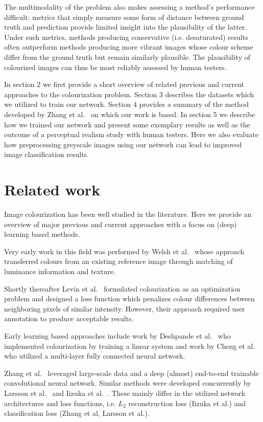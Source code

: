 \documentclass{article}
\begin{document}
The multimodality of the problem also makes assessing a method's performance
difficult: metrics that simply measure some form of distance between ground
truth and prediction provide limited insight into the plausibility of the
latter. Under such metrics, methods producing conservative (i.e. desaturated)
results often outperform methods producing more vibrant images whose colour
scheme differ from the ground truth but remain similarly plausible. The
plausibility of colourized images can thus be most reliably assessed by human
testers.

In section 2 we first provide a short overview of related previous and current
approaches to the colourization problem. Section 3 describes the datasets which
we utilized to train our network. Section 4 provides a summary of the
method developed by Zhang et al.~\cite{Zhang2016} on which our work is based.
In section 5 we describe how we trained our network and present some exemplary
results as well as the outcome of a perceptual realism study with human
testers. Here we also evaluate how preprocessing greyscale images using our
network can lead to improved image classification results.

\section{Related work}

Image colourization has been well studied in the literature. Here we provide an
overview of major previous and current approaches with a focus on (deep)
learning based methods.

Very early work in this field was performed by Welsh et al.~\cite{Welsh2002}
whose approach transferred colours from an existing reference image through
matching of luminance information and texture.

Shortly thereafter Levin et al.~\cite{Levin2004} formulated colourization as an
optimization problem and designed a loss function which penalizes colour
differences between neighboring pixels of similar intensity. However, their
approach required user annotation to produce acceptable results.

Early learning based approaches include work by Deshpande et
al.~\cite{Deshpande2015} who implemented colourization by training a linear
system and work by Cheng et al.~\cite{Cheng2015}  who utilized a multi-layer
fully connected neural network.

Zhang et al.~\cite{Zhang2016} leveraged large-scale data and a deep (almost)
end-to-end trainable convolutional neural network. Similar methods were
developed concurrently by Larsson et al.~\cite{Larsson2016} and Iizuka et
al.~\cite{Iizuka2016}. These mainly differ in the utilized network
architectures and loss functions, i.e. $L_2$ reconstruction loss (Iizuka et
al.) and classification loss (Zhang et al, Larsson et al.).
\end{document}
